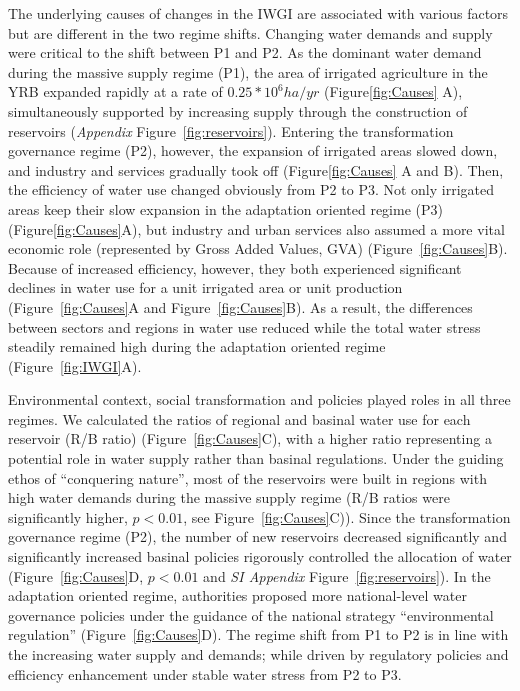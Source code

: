 The underlying causes of changes in the IWGI are associated with various factors but are different in the two regime shifts.
Changing water demands and supply were critical to the shift between P1 and P2.
As the dominant water demand during the massive supply regime (P1), the area of irrigated agriculture in the YRB expanded rapidly at a rate of $0.25*10^6 ha/yr$ (Figure\ref{fig:Causes} A), simultaneously supported by increasing supply through the construction of reservoirs (\textit{Appendix} Figure~\ref{fig:reservoirs}).
Entering the transformation governance regime (P2), however, the expansion of irrigated areas slowed down, and industry and services gradually took off (Figure\ref{fig:Causes} A and B).
Then, the efficiency of water use changed obviously from P2 to P3.
Not only irrigated areas keep their slow expansion in the adaptation oriented regime (P3) (Figure\ref{fig:Causes}A), but industry and urban services also assumed a more vital economic role (represented by Gross Added Values, GVA) (Figure~\ref{fig:Causes}B).
Because of increased efficiency, however, they both experienced significant declines in water use for a unit irrigated area or unit production (Figure~\ref{fig:Causes}A and Figure~\ref{fig:Causes}B).
As a result, the differences between sectors and regions in water use reduced while the total water stress steadily remained high during the adaptation oriented regime (Figure~\ref{fig:IWGI}A).

Environmental context, social transformation and policies played roles in all three regimes.
We calculated the ratios of regional and basinal water use for each reservoir (R/B ratio) (Figure~\ref{fig:Causes}C), with a higher ratio representing a potential role in water supply rather than basinal regulations.
Under the guiding ethos of ``conquering nature'', most of the reservoirs were built in regions with high water demands during the massive supply regime (R/B ratios were significantly higher, $p<0.01$, see Figure~\ref{fig:Causes}C)).
Since the transformation governance regime (P2), the number of new reservoirs decreased significantly and significantly increased basinal policies rigorously controlled the allocation of water (Figure~\ref{fig:Causes}D, $p<0.01$ and \textit{SI Appendix} Figure~\ref{fig:reservoirs}).
In the adaptation oriented regime, authorities proposed more national-level water governance policies under the guidance of the national strategy ``environmental regulation'' (Figure~\ref{fig:Causes}D).
The regime shift from P1 to P2 is in line with the increasing water supply and demands; while driven by regulatory policies and efficiency enhancement under stable water stress from P2 to P3.
